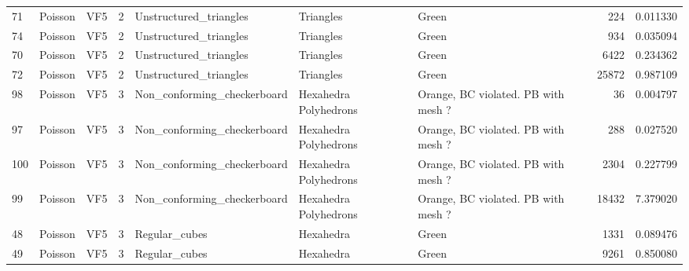 \begin{tabular}{lllrlllrr}
71  &           Poisson &                            VF5 &               2 &          Unstructured\_triangles &              Triangles  &                                Green &                      224 &                         0.011330 \\
74  &           Poisson &                            VF5 &               2 &          Unstructured\_triangles &              Triangles  &                                Green &                      934 &                         0.035094 \\
70  &           Poisson &                            VF5 &               2 &          Unstructured\_triangles &              Triangles  &                                Green &                     6422 &                         0.234362 \\
72  &           Poisson &                            VF5 &               2 &          Unstructured\_triangles &              Triangles  &                                Green &                    25872 &                         0.987109 \\
98  &           Poisson &                            VF5 &               3 &     Non\_conforming\_checkerboard &  Hexahedra Polyhedrons  &  Orange, BC violated. PB with mesh ? &                       36 &                         0.004797 \\
97  &           Poisson &                            VF5 &               3 &     Non\_conforming\_checkerboard &  Hexahedra Polyhedrons  &  Orange, BC violated. PB with mesh ? &                      288 &                         0.027520 \\
100 &           Poisson &                            VF5 &               3 &     Non\_conforming\_checkerboard &  Hexahedra Polyhedrons  &  Orange, BC violated. PB with mesh ? &                     2304 &                         0.227799 \\
99  &           Poisson &                            VF5 &               3 &     Non\_conforming\_checkerboard &  Hexahedra Polyhedrons  &  Orange, BC violated. PB with mesh ? &                    18432 &                         7.379020 \\
48  &           Poisson &                            VF5 &               3 &                   Regular\_cubes &              Hexahedra  &                                Green &                     1331 &                         0.089476 \\
49  &           Poisson &                            VF5 &               3 &                   Regular\_cubes &              Hexahedra  &                                Green &                     9261 &                         0.850080 \\

\end{tabular}
